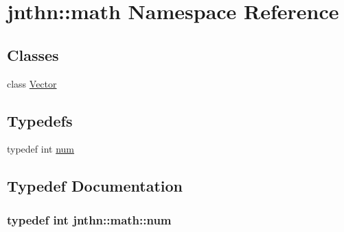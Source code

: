 \hypertarget{namespacejnthn_1_1math}{\section{jnthn\-:\-:math Namespace Reference}
\label{namespacejnthn_1_1math}
}
\subsection*{Classes}
\begin{DoxyCompactItemize}
\item 
class \hyperlink{classjnthn_1_1math_1_1Vector}{Vector}
\end{DoxyCompactItemize}
\subsection*{Typedefs}
\begin{DoxyCompactItemize}
\item 
typedef int \hyperlink{namespacejnthn_1_1math_a5d3a263452a9caabf22cbb66cec013e9}{num}
\end{DoxyCompactItemize}


\subsection{Typedef Documentation}
\hypertarget{namespacejnthn_1_1math_a5d3a263452a9caabf22cbb66cec013e9}{
\subsubsection[{num}]{\setlength{\rightskip}{0pt plus 5cm}typedef int {\bf jnthn\-::math\-::num}}}\label{namespacejnthn_1_1math_a5d3a263452a9caabf22cbb66cec013e9}
